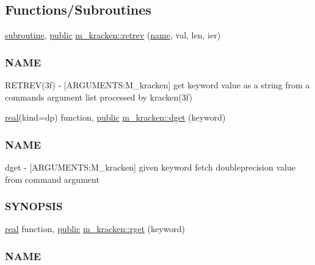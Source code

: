 \subsection*{Functions/\+Subroutines}
\begin{DoxyCompactItemize}
\item 
\hyperlink{M__stopwatch_83_8txt_acfbcff50169d691ff02d4a123ed70482}{subroutine}, \hyperlink{M__stopwatch_83_8txt_a2f74811300c361e53b430611a7d1769f}{public} \hyperlink{namespacem__kracken_ad4f3d7c793c90789b175097b433035da}{m\+\_\+kracken\+::retrev} (\hyperlink{M__stopwatch_83_8txt_a3f508a893ae4c3b397b4383e33b9bcae}{name}, val, len, ier)
\begin{DoxyCompactList}\small\item\em \subsubsection*{N\+A\+ME}

R\+E\+T\+R\+E\+V(3f) -\/ \mbox{[}A\+R\+G\+U\+M\+E\+N\+TS\+:M\+\_\+kracken\mbox{]} get keyword value as a string from a command\textquotesingle{}s argument list processed by kracken(3f) \end{DoxyCompactList}\item 
\hyperlink{read__watch_83_8txt_abdb62bde002f38ef75f810d3a905a823}{real}(kind=dp) function, \hyperlink{M__stopwatch_83_8txt_a2f74811300c361e53b430611a7d1769f}{public} \hyperlink{namespacem__kracken_ae7b6ad046d637f03148efb56336a7ff4}{m\+\_\+kracken\+::dget} (keyword)
\begin{DoxyCompactList}\small\item\em \subsubsection*{N\+A\+ME}

dget -\/ \mbox{[}A\+R\+G\+U\+M\+E\+N\+TS\+:M\+\_\+kracken\mbox{]} given keyword fetch doubleprecision value from command argument \subsubsection*{S\+Y\+N\+O\+P\+S\+IS}\end{DoxyCompactList}\item 
\hyperlink{read__watch_83_8txt_abdb62bde002f38ef75f810d3a905a823}{real} function, \hyperlink{M__stopwatch_83_8txt_a2f74811300c361e53b430611a7d1769f}{public} \hyperlink{namespacem__kracken_a21e0e40932af79430832a53bdb4de300}{m\+\_\+kracken\+::rget} (keyword)
\begin{DoxyCompactList}\small\item\em \subsubsection*{N\+A\+ME}


\end{DoxyCompactList}
\end{DoxyCompactItemize}
